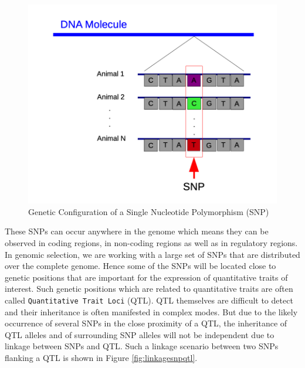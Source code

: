 \documentclass[
]{book}
\theoremstyle{definition}
\theoremstyle{definition}
\theoremstyle{definition}
\theoremstyle{remark}
\begin{document}
\begin{figure}
\includegraphics[width=12.22in]{odg/snpgeneticconfiguration} \caption{Genetic Configuration of a Single Nucleotide Polymorphism (SNP)}\label{fig:snpgeneticconfiguration}
\end{figure}

These SNPs can occur anywhere in the genome which means they can be observed in coding regions, in non-coding regions as well as in regulatory regions. In genomic selection, we are working with a large set of SNPs that are distributed over the complete genome. Hence some of the SNPs will be located close to genetic positions that are important for the expression of quantitative traits of interest. Such genetic positions which are related to quantitative traits are often called \texttt{Quantitative\ Trait\ Loci} (QTL). QTL themselves are difficult to detect and their inheritance is often manifested in complex modes. But due to the likely occurrence of several SNPs in the close proximity of a QTL, the inheritance of QTL alleles and of surrounding SNP alleles will not be independent due to linkage between SNPs and QTL. Such a linkage scenario between two SNPs flanking a QTL is shown in Figure \ref{fig:linkagesnpqtl}.
\end{document}
